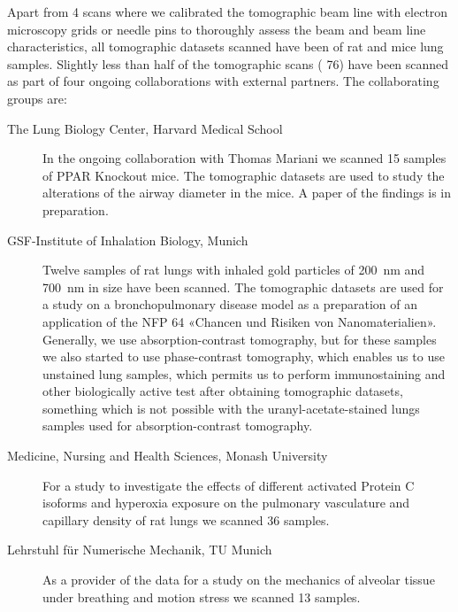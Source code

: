 \documentclass[a4paper,twoside,DIV=calc]{scrartcl}
\begin{document}
Apart from 4 scans where we calibrated the tomographic beam line with electron microscopy grids or needle pins to thoroughly assess the beam and beam line characteristics, all tomographic datasets scanned have been of rat and mice lung samples. Slightly less than half of the tomographic scans (%
76) have been scanned as part of four ongoing collaborations with external partners. The collaborating groups are:
\begin{description}
\item[The Lung Biology Center, Harvard Medical School] In the ongoing collaboration with Thomas Mariani we scanned 15 samples of PPAR Knockout mice. The tomographic datasets are used to study the alterations of the airway diameter in the mice. A paper of the findings is in preparation.
\item[GSF-Institute of Inhalation Biology, Munich] Twelve samples of rat lungs with inhaled gold particles of \SI{200}{\nano\meter} and \SI{700}{\nano\meter} in size have been scanned. The tomographic datasets are used for a study on a bronchopulmonary disease model as a preparation of an application of the NFP 64 «Chancen und Risiken von Nanomaterialien». Generally, we use absorption-contrast tomography, but for these samples we also started to use phase-contrast tomography, which enables us to use unstained lung samples, which permits us to perform immunostaining and other biologically active test after obtaining tomographic datasets, something which is not possible with the uranyl-acetate-stained lungs samples used for absorption-contrast tomography.
\item[Medicine, Nursing and Health Sciences, Monash University] For a study to investigate the effects of different activated Protein C isoforms and hyperoxia exposure on the pulmonary vasculature and capillary density of rat lungs we scanned 36 samples. 
\item[Lehrstuhl für Numerische Mechanik, TU Munich] As a provider of the data for a study on the mechanics of alveolar tissue under breathing and motion stress we scanned 13 samples.
\end{description}
\end{document}
